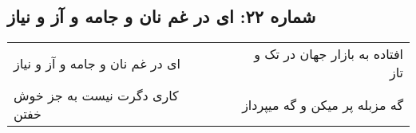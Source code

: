 \begin{center}
\section*{شماره ۲۲: ای در غم نان و جامه و آز و نیاز}
\label{sec:022}
\begin{longtable}{l p{0.5cm} r}
ای در غم نان و جامه و آز و نیاز
&&
افتاده به بازار جهان در تک و تاز
\\
کاری دگرت نیست به جز خوش خفتن
&&
گه مزبله پر میکن و گه میپرداز
\\
\end{longtable}
\end{center}
